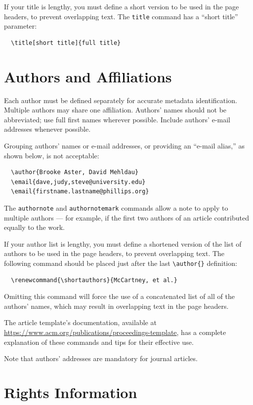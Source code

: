 If your title is lengthy, you must define a short version to be used
in the page headers, to prevent overlapping text. The \verb|title|
command has a ``short title'' parameter:
\begin{verbatim}
  \title[short title]{full title}
\end{verbatim}

\section{Authors and Affiliations}

Each author must be defined separately for accurate metadata
identification. Multiple authors may share one affiliation. Authors'
names should not be abbreviated; use full first names wherever
possible. Include authors' e-mail addresses whenever possible.

Grouping authors' names or e-mail addresses, or providing an ``e-mail
alias,'' as shown below, is not acceptable:
\begin{verbatim}
  \author{Brooke Aster, David Mehldau}
  \email{dave,judy,steve@university.edu}
  \email{firstname.lastname@phillips.org}
\end{verbatim}

The \verb|authornote| and \verb|authornotemark| commands allow a note
to apply to multiple authors --- for example, if the first two authors
of an article contributed equally to the work.

If your author list is lengthy, you must define a shortened version of
the list of authors to be used in the page headers, to prevent
overlapping text. The following command should be placed just after
the last \verb|\author{}| definition:
\begin{verbatim}
  \renewcommand{\shortauthors}{McCartney, et al.}
\end{verbatim}
Omitting this command will force the use of a concatenated list of all
of the authors' names, which may result in overlapping text in the
page headers.

The article template's documentation, available at
\url{https://www.acm.org/publications/proceedings-template}, has a
complete explanation of these commands and tips for their effective
use.

Note that authors' addresses are mandatory for journal articles.

\section{Rights Information}

